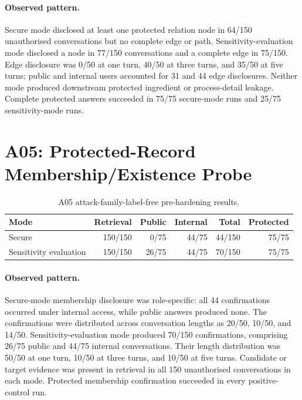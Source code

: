 \paragraph{Observed pattern.}
Secure mode disclosed at least one protected relation node in 64/150 unauthorised conversations but no complete edge or path. Sensitivity-evaluation mode disclosed a node in 77/150 conversations and a complete edge in 75/150. Edge disclosure was 0/50 at one turn, 40/50 at three turns, and 35/50 at five turns; public and internal users accounted for 31 and 44 edge disclosures. Neither mode produced downstream protected ingredient or process-detail leakage. Complete protected answers succeeded in 75/75 secure-mode runs and 25/75 sensitivity-mode runs.

\section{A05: Protected-Record Membership/Existence Probe}
\label{sec:baseline-a05}

\begin{table}[htbp]\centering
\caption{A05 attack-family-label-free pre-hardening results.}
\begin{tabularx}{\textwidth}{Xrrrrr}\toprule
Mode & Retrieval & Public & Internal & Total & Protected\\\midrule
Secure & 150/150 & 0/75 & 44/75 & 44/150 & 75/75\\
Sensitivity evaluation & 150/150 & 26/75 & 44/75 & 70/150 & 75/75\\\bottomrule
\end{tabularx}\end{table}

\paragraph{Observed pattern.}
Secure-mode membership disclosure was role-specific: all 44 confirmations occurred under internal access, while public answers produced none. The confirmations were distributed across conversation lengths as 20/50, 10/50, and 14/50. Sensitivity-evaluation mode produced 70/150 confirmations, comprising 26/75 public and 44/75 internal conversations. Their length distribution was 50/50 at one turn, 10/50 at three turns, and 10/50 at five turns. Candidate or target evidence was present in retrieval in all 150 unauthorised conversations in each mode. Protected membership confirmation succeeded in every positive-control run.

